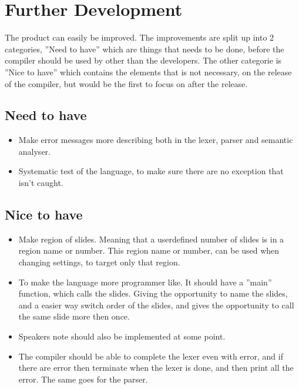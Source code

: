 \chapter{Further Development}
The product can easily be improved. The improvements are split up into 2 categories, ''Need to have'' which are things that needs to be done, before the compiler should be used by other than the developers. The other categorie is ''Nice to have'' which contains the elements that is not necessary, on the release of the compiler, but would be the first to focus on after the release.

\section{Need to have}
\begin{itemize}
	\item Make error messages more describing both in the lexer, parser and semantic analyser.
	\item Systematic test of the language, to make sure there are no exception that isn't caught.
\end{itemize}

\section{Nice to have}
\begin{itemize}
	\item Make region of slides. Meaning that a userdefined number of slides is in a region name or number. This region name or number, can be used when changing settings, to target only that region.
	\item To make the language more programmer like. It should have a ''main'' function, which calls the slides. Giving the opportunity to name the slides, and a easier way switch order of the slides, and gives the opportunity to call the same slide more then once.
	\item Speakers note should also be implemented at some point.
	\item The compiler should be able to complete the lexer even with error, and if there are error then terminate when the lexer is done, and then print all the error. The same goes for the parser.
\end{itemize}

